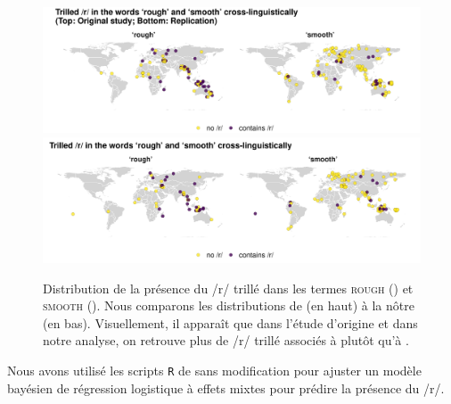 \begin{figure}
	\centering
	\includegraphics[width=1\linewidth, trim={0 0 0 0},clip]{substance/images/xling_map}
	\includegraphics[width=1\linewidth, trim={0 0 0 1cm},clip]{substance/images/xling_map_revision}
	\caption[Distribution de la présence du /r/ trillé dans les termes  et ]{Distribution de la présence du /r/ trillé dans les termes \textsc{rough} () et \textsc{smooth} (). Nous comparons les distributions de \textcite{winterTrilledAssociatedRoughness2022} (en haut) à la nôtre (en bas). Visuellement, il apparaît que dans l'étude d'origine et dans notre analyse, on retrouve plus de /r/ trillé associés à  plutôt qu'à .}
	\label{fig:xlingmap}
\end{figure}


Nous avons utilisé les scripts \texttt{R} de \textcite{winterTrilledAssociatedRoughness2022} sans modification pour ajuster un modèle bayésien de régression logistique à effets mixtes pour prédire la présence du /r/.

